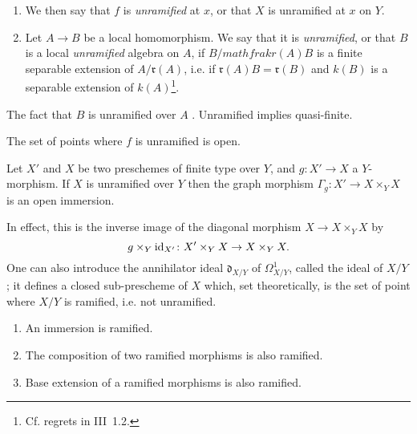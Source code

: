 \begin{defn}
    \begin{enumerate}[\normalfont(a)]
        \item We then say that $f$ is \emph{unramified} at $x$, or that $X$ is unramified at $x$ on $Y$.
        \item Let $A\to B$ be a local homomorphism.
            We say that it is \emph{unramified}, or that $B$ is a local \emph{unramified} algebra on $A$, if $B/mathfrak{r}(A)B$ is a finite separable extension of $A/\mathfrak{r}(A)$, i.e. if $\mathfrak{r}(A)B=\mathfrak{r}(B)$ and $k(B)$ is a separable extension of $k(A)$\footnote{Cf. regrets in III~1.2.}.
    \end{enumerate}
\end{defn}

\begin{rem}
    The fact that $B$ is unramified over $A$ \completelyunsure.
    Unramified implies quasi-finite.
\end{rem}

\begin{cor}
    The set of points where $f$ is unramified is open.
\end{cor}

\begin{cor}
    Let $X'$ and $X$ be two preschemes of finite type over $Y$, and $g\colon X'\to X$ a $Y$-morphism.
    If $X$ is unramified over $Y$ then the graph morphism $\Gamma_g\colon X'\to X\times_Y X$ is an open immersion.
\end{cor}

In effect, this is the inverse image of the diagonal morphism $X\to X\times_Y X$ by
\begin{equation*}
    g\times_Y \mathrm{id}_{X'}\colon X'\times_Y X\to X\times_Y X.
\end{equation*}
One can also introduce the annihilator ideal $\mathfrak{d}_{X/Y}$ of $\Omega_{X/Y}^1$, called the  ideal of $X/Y$; it defines a closed sub-prescheme of $X$ which, set theoretically, is the set of point where $X/Y$ is ramified, i.e. not unramified.

\begin{prop}
    \begin{enumerate}[\normalfont(i)]
        \item An immersion is ramified.
        \item The composition of two ramified morphisms is also ramified.
        \item Base extension of a ramified morphisms is also ramified.
    \end{enumerate}
\end{prop}

